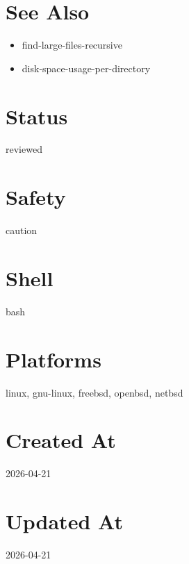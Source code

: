 \documentclass{article}
\begin{document}
\section*{See Also}
\begin{itemize}
  \item find-large-files-recursive
  \item disk-space-usage-per-directory
\end{itemize}

\section*{Status}
reviewed

\section*{Safety}
caution

\section*{Shell}
bash

\section*{Platforms}
linux, gnu-linux, freebsd, openbsd, netbsd

\section*{Created At}
2026-04-21

\section*{Updated At}
2026-04-21
\end{document}
